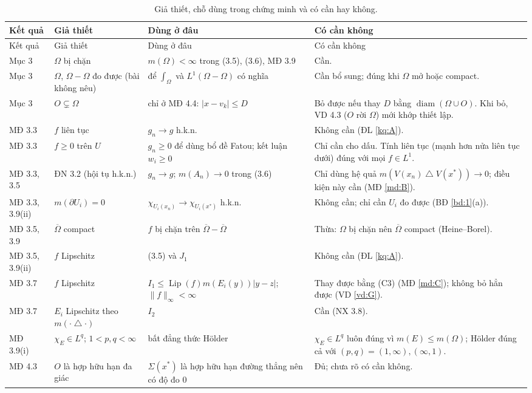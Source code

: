 \documentclass[12pt,a4paper]{article}
\theoremstyle{plain}
\theoremstyle{definition}
\newcommand{\Lip}{\operatorname{Lip}}
\newcommand{\diam}{\operatorname{diam}}
\newcommand{\sd}{\mathbin{\triangle}}
\begin{document}
{\small
\begin{longtable}{@{}p{1.7cm}p{3.3cm}p{4.9cm}p{5.0cm}@{}}
\caption{Giả thiết, chỗ dùng trong chứng minh và có cần hay không.}\label{tab:audit}\\
\toprule
Kết quả & Giả thiết & Dùng ở đâu & Có cần không \\
\midrule
\endfirsthead
\toprule
Kết quả & Giả thiết & Dùng ở đâu & Có cần không \\
\midrule
\endhead
Mục 3 & $\Omega$ bị chặn & $m(\Omega)<\infty$ trong (3.5), (3.6), MĐ 3.9 & Cần. \\
Mục 3 & $\Omega$, $\Omega-\Omega$ đo được (bài không nêu) & để $\int_\Omega$ và $L^1(\Omega-\Omega)$ có nghĩa & Cần bổ sung; đúng khi $\Omega$ mở hoặc compact. \\
Mục 3 & $O\subsetneq\Omega$ & chỉ ở MĐ 4.4: $|x-v_k|\le D$ & Bỏ được nếu thay $D$ bằng $\diam(\Omega\cup O)$. Khi bỏ, VD 4.3 ($O$ rời $\Omega$) mới khớp thiết lập. \\
MĐ 3.3 & $f$ liên tục & $g_n\to g$ h.k.n. & Không cần (ĐL \ref{kq:A}). \\
MĐ 3.3 & $f\ge0$ trên $U$ & $g_n\ge0$ để dùng bổ đề Fatou; kết luận $w_i\ge0$ & Chỉ cần cho dấu. Tính liên tục (mạnh hơn nửa liên tục dưới) đúng với mọi $f\in L^1$. \\
MĐ 3.3, 3.5 & ĐN 3.2 (hội tụ h.k.n.) & $g_n\to g$; $m(A_n)\to0$ trong (3.6) & Chỉ dùng hệ quả $m(V(x_n)\sd V(x^*))\to0$; điều kiện này cần (MĐ \ref{md:B}). \\
MĐ 3.3, 3.9(ii) & $m(\partial U_i)=0$ & $\chi_{U_i(x_n)}\to\chi_{U_i(x^*)}$ h.k.n. & Không cần; chỉ cần $U_i$ đo được (BĐ \ref{bd:1}(a)). \\
MĐ 3.5, 3.9 & $\overline\Omega$ compact & $f$ bị chặn trên $\overline\Omega-\overline\Omega$ & Thừa: $\Omega$ bị chặn nên $\overline\Omega$ compact (Heine--Borel). \\
MĐ 3.5, 3.9(ii) & $f$ Lipschitz & (3.5) và $J_1$ & Không cần (ĐL \ref{kq:A}). \\
MĐ 3.7 & $f$ Lipschitz & $I_1\le\Lip(f)m(E_i(y))|y-z|$; $\|f\|_\infty<\infty$ & Thay được bằng (C3) (MĐ \ref{md:C}); không bỏ hẳn được (VD \ref{vd:G}). \\
MĐ 3.7 & $E_i$ Lipschitz theo $m(\cdot\sd\cdot)$ & $I_2$ & Cần (NX 3.8). \\
MĐ 3.9(i) & $\chi_E\in L^q$; $1<p,q<\infty$ & bất đẳng thức Hölder & $\chi_E\in L^q$ luôn đúng vì $m(E)\le m(\Omega)$; Hölder đúng cả với $(p,q)=(1,\infty),(\infty,1)$. \\
MĐ 4.3 & $O$ là hợp hữu hạn đa giác & $\Sigma(x^*)$ là hợp hữu hạn đường thẳng nên có độ đo $0$ & Đủ; chưa rõ có cần không. \\

\end{longtable}}
\end{document}
